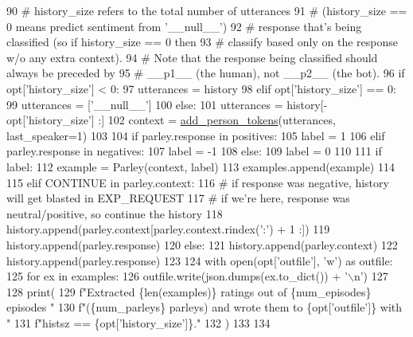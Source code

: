 \begin{DoxyCode}
90                 \textcolor{comment}{# history\_size refers to the total number of utterances}
91                 \textcolor{comment}{# (history\_size == 0 means predict sentiment from '\_\_null\_\_')}
92                 \textcolor{comment}{# response that's being classified (so if history\_size == 0 then}
93                 \textcolor{comment}{# classify based only on the response w/o any extra context).}
94                 \textcolor{comment}{# Note that the response being classified should always be preceded by}
95                 \textcolor{comment}{# \_\_p1\_\_ (the human), not \_\_p2\_\_ (the bot).}
96                 \textcolor{keywordflow}{if} opt[\textcolor{stringliteral}{'history\_size'}] < 0:
97                     utterances = history
98                 \textcolor{keywordflow}{elif} opt[\textcolor{stringliteral}{'history\_size'}] == 0:
99                     utterances = [\textcolor{stringliteral}{'\_\_null\_\_'}]
100                 \textcolor{keywordflow}{else}:
101                     utterances = history[-opt[\textcolor{stringliteral}{'history\_size'}] :]
102                 context = \hyperlink{namespaceprojects_1_1self__feeding_1_1utils_a3f3d055dc6c4058057baae7b240de5ec}{add\_person\_tokens}(utterances, last\_speaker=1)
103 
104                 \textcolor{keywordflow}{if} parley.response \textcolor{keywordflow}{in} positives:
105                     label = 1
106                 \textcolor{keywordflow}{elif} parley.response \textcolor{keywordflow}{in} negatives:
107                     label = -1
108                 \textcolor{keywordflow}{else}:
109                     label = 0
110 
111                 \textcolor{keywordflow}{if} label:
112                     example = Parley(context, label)
113                     examples.append(example)
114 
115             \textcolor{keywordflow}{elif} CONTINUE \textcolor{keywordflow}{in} parley.context:
116                 \textcolor{comment}{# if response was negative, history will get blasted in EXP\_REQUEST}
117                 \textcolor{comment}{# if we're here, response was neutral/positive, so continue the history}
118                 history.append(parley.context[parley.context.rindex(\textcolor{stringliteral}{':'}) + 1 :])
119                 history.append(parley.response)
120             \textcolor{keywordflow}{else}:
121                 history.append(parley.context)
122                 history.append(parley.response)
123 
124     with open(opt[\textcolor{stringliteral}{'outfile'}], \textcolor{stringliteral}{'w'}) \textcolor{keyword}{as} outfile:
125         \textcolor{keywordflow}{for} ex \textcolor{keywordflow}{in} examples:
126             outfile.write(json.dumps(ex.to\_dict()) + \textcolor{stringliteral}{'\(\backslash\)n'})
127 
128     print(
129         f\textcolor{stringliteral}{"Extracted \{len(examples)\} ratings out of \{num\_episodes\} episodes "}
130         f\textcolor{stringliteral}{"(\{num\_parleys\} parleys) and wrote them to \{opt['outfile']\} with "}
131         f\textcolor{stringliteral}{"histsz == \{opt['history\_size']\}."}
132     )
133 
134 
\end{DoxyCode}
